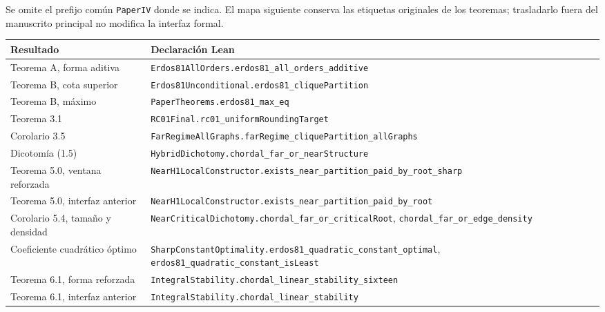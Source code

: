 \documentclass[spanish,11pt,a4paper]{article}
\newcounter{none}
\begin{document}
Se omite el prefijo común \nolinkurl{PaperIV} donde se indica. El mapa
siguiente conserva las etiquetas originales de los teoremas; trasladarlo
fuera del manuscrito principal no modifica la interfaz formal.

{\def\LTcaptype{none} %
\begin{longtable}[]{@{}
  >{\raggedright\arraybackslash}p{}
  >{\raggedright\arraybackslash}p{}@{}}
\toprule\noalign{}
\begin{minipage}[b]{\linewidth}\raggedright
Resultado
\end{minipage} & \begin{minipage}[b]{\linewidth}\raggedright
Declaración Lean
\end{minipage} \\
\midrule\noalign{}
\endhead
\bottomrule\noalign{}
\endlastfoot
Teorema A, forma aditiva &
\nolinkurl{Erdos81AllOrders.erdos81_all_orders_additive} \\
Teorema B, cota superior &
\nolinkurl{Erdos81Unconditional.erdos81_cliquePartition} \\
Teorema B, máximo & \nolinkurl{PaperTheorems.erdos81_max_eq} \\
Teorema 3.1 & \nolinkurl{RC01Final.rc01_uniformRoundingTarget} \\
Corolario 3.5 &
\nolinkurl{FarRegimeAllGraphs.farRegime_cliquePartition_allGraphs} \\
Dicotomía (1.5) &
\nolinkurl{HybridDichotomy.chordal_far_or_nearStructure} \\
Teorema 5.0, ventana reforzada &
\nolinkurl{NearH1LocalConstructor.exists_near_partition_paid_by_root_sharp} \\
Teorema 5.0, interfaz anterior &
\nolinkurl{NearH1LocalConstructor.exists_near_partition_paid_by_root} \\
Corolario 5.4, tamaño y densidad &
\nolinkurl{NearCriticalDichotomy.chordal_far_or_criticalRoot},
\nolinkurl{chordal_far_or_edge_density} \\
Coeficiente cuadrático óptimo &
\nolinkurl{SharpConstantOptimality.erdos81_quadratic_constant_optimal},
\nolinkurl{erdos81_quadratic_constant_isLeast} \\
Teorema 6.1, forma reforzada &
\nolinkurl{IntegralStability.chordal_linear_stability_sixteen} \\
Teorema 6.1, interfaz anterior &
\nolinkurl{IntegralStability.chordal_linear_stability} \\

\end{longtable}}
\end{document}
